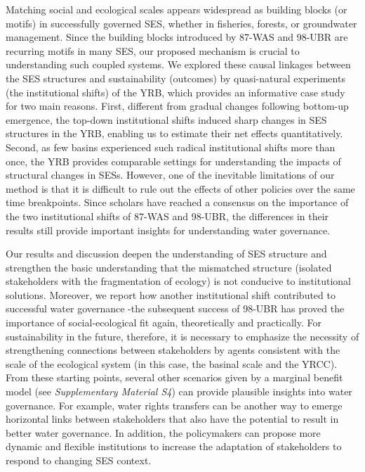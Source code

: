 Matching social and ecological scales appears widespread as building blocks (or motifs) in successfully governed SES, whether in fisheries, forests, or groundwater management.
Since the building blocks introduced by 87-WAS and 98-UBR are recurring motifs in many SES, our proposed mechanism is crucial to understanding such coupled systems.
We explored these causal linkages between the SES structures and sustainability (outcomes) by quasi-natural experiments (the institutional shifts) of the YRB, which provides an informative case study for two main reasons.
First, different from gradual changes following bottom-up emergence, the top-down institutional shifts induced sharp changes in SES structures in the YRB, enabling us to estimate their net effects quantitatively.
Second, as few basins experienced such radical institutional shifts more than once, the YRB provides comparable settings for understanding the impacts of structural changes in SESs.
However, one of the inevitable limitations of our method is that it is difficult to rule out the effects of other policies over the same time breakpoints.
Since scholars have reached a consensus on the importance of the two institutional shifts of 87-WAS and 98-UBR, the differences in their results still provide important insights for understanding water governance.

Our results and discussion deepen the understanding of SES structure and strengthen the basic understanding that the mismatched structure (isolated stakeholders with the fragmentation of ecology) is not conducive to institutional solutions.
Moreover, we report how another institutional shift contributed to successful water governance  -the subsequent success of 98-UBR has proved the importance of social-ecological fit again, theoretically and practically.
For sustainability in the future, therefore, it is necessary to emphasize the necessity of strengthening connections between stakeholders by agents consistent with the scale of the ecological system (in this case, the basinal scale and the YRCC).
From these starting points, several other scenarios given by a marginal benefit model (see \textit{Supplementary Material S4}) can provide plausible insights into water governance.
For example, water rights transfers can be another way to emerge horizontal links between stakeholders that also have the potential to result in better water governance.
In addition, the policymakers can propose more dynamic and flexible institutions to increase the adaptation of stakeholders to respond to changing SES context.

